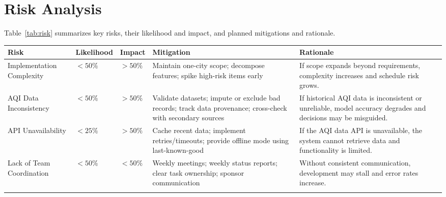 \section{Risk Analysis}

Table~\ref{tab:risk} summarizes key risks, their likelihood and impact, and planned mitigations and rationale.
\linebreak

\begingroup
    \small
    \setlength{\LTpre}{0pt}
    \setlength{\LTpost}{0pt}
    \begin{longtable}{@{}p{2.4cm}<{\raggedright} p{1.8cm}<{\raggedright} p{1.2cm}<{\raggedright} p{4.1cm}<{\raggedright} p{4.2cm}<{\raggedright}@{}}
        \hline
        \textbf{Risk} & \textbf{Likelihood} & \textbf{Impact} & \textbf{Mitigation} & \textbf{Rationale} \\
        \hline
        \arrayrulecolor{gray!30}
        
        Implementation Complexity   & $<50\%$   & $>50\%$   & Maintain one-city scope; decompose features; spike high-risk items early                                      & If scope expands beyond requirements, complexity increases and schedule risk grows. \\
        \hline
        AQI Data Inconsistency      & $<50\%$   & $>50\%$   & Validate datasets; impute or exclude bad records; track data provenance; cross-check with secondary sources   & If historical AQI data is inconsistent or unreliable, model accuracy degrades and decisions may be misguided. \\
        \hline
        API Unavailability          & $<25\%$   & $>50\%$   & Cache recent data; implement retries/timeouts; provide offline mode using last-known-good                     & If the AQI data API is unavailable, the system cannot retrieve data and functionality is limited. \\
        \hline
        Lack of Team Coordination   & $<50\%$   & $<50\%$   & Weekly meetings; weekly status reports; clear task ownership; sponsor communication                           & Without consistent communication, development may stall and error rates increase. \\

        \arrayrulecolor{black}
        \hline
    \end{longtable}
\endgroup